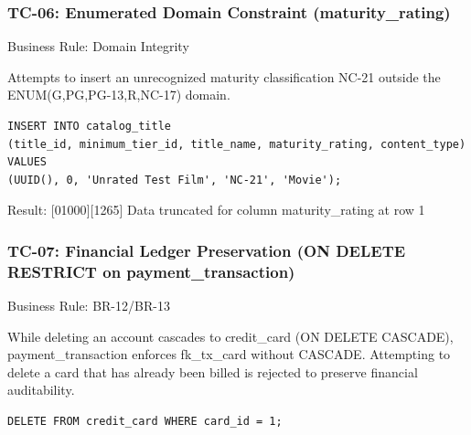 \subsubsection{\texorpdfstring{\textbullet{} \textbf{TC-06: Enumerated Domain Constraint (maturity\_\allowbreak{}rating)}}{\textbullet{} TC-06: Enumerated Domain Constraint (maturity\_\allowbreak{}rating)}}\label{tc-06-enumerated-domain-constraint-maturity_rating}

Business Rule: Domain Integrity

Attempts to insert an unrecognized maturity classification \textquotesingle NC-21\textquotesingle{} outside the ENUM(\textquotesingle G\textquotesingle,\textquotesingle PG\textquotesingle,\textquotesingle PG-13\textquotesingle,\textquotesingle R\textquotesingle,\textquotesingle NC-17\textquotesingle) domain.

\begin{lstlisting}[style=reportsql,title={Verification SQL}]
INSERT INTO catalog_title
(title_id, minimum_tier_id, title_name, maturity_rating, content_type)
VALUES
(UUID(), 0, 'Unrated Test Film', 'NC-21', 'Movie');
\end{lstlisting}



 \textbullet{} Result: {[}01000{]}{[}1265{]} Data truncated for column \textquotesingle maturity\_\allowbreak{}rating\textquotesingle{} at row 1

\subsubsection{\texorpdfstring{\textbullet{} \textbf{TC-07: Financial Ledger Preservation (ON DELETE RESTRICT on payment\_\allowbreak{}transaction)}}{\textbullet{} TC-07: Financial Ledger Preservation (ON DELETE RESTRICT on payment\_\allowbreak{}transaction)}}\label{tc-07-financial-ledger-preservation-on-delete-restrict-on-payment_transaction}

Business Rule: BR-12/BR-13

While deleting an account cascades to credit\_\allowbreak{}card (ON DELETE CASCADE), payment\_\allowbreak{}transaction enforces fk\_\allowbreak{}tx\_\allowbreak{}card without CASCADE. Attempting to delete a card that has already been billed is rejected to preserve financial auditability.

\begin{lstlisting}[style=reportsql,title={Verification SQL}]
DELETE FROM credit_card WHERE card_id = 1;
\end{lstlisting}



